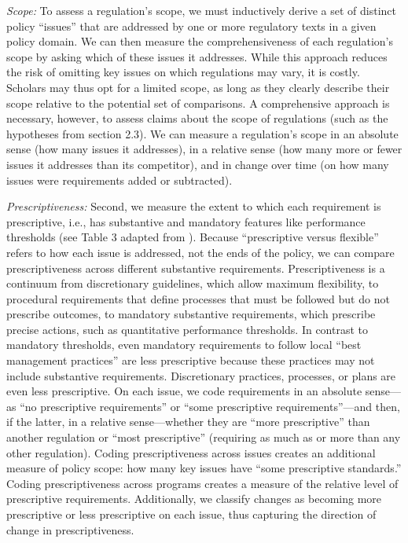 \documentclass[
      12pt,
            Review ]{article}
\begin{document}


\emph{Scope:} To assess a regulation's scope, we must inductively derive
a set of distinct policy ``issues'' that are addressed by one or more
regulatory texts in a given policy domain. We can then measure the
comprehensiveness of each regulation's scope by asking which of these
issues it addresses. While this approach reduces the risk of omitting
key issues on which regulations may vary, it is costly. Scholars may
thus opt for a limited scope, as long as they clearly describe their
scope relative to the potential set of comparisons. A comprehensive
approach is necessary, however, to assess claims about the scope of
regulations (such as the hypotheses from section 2.3). We can measure a
regulation's scope in an absolute sense (how many issues it addresses),
in a relative sense (how many more or fewer issues it addresses than its
competitor), and in change over time (on how many issues were
requirements added or subtracted).

\emph{Prescriptiveness:} Second, we measure the extent to which each
requirement is prescriptive, i.e., has substantive and mandatory
features like performance thresholds (see Table 3 adapted from
\citet{Cashore2007}). Because ``prescriptive versus flexible'' refers to
how each issue is addressed, not the ends of the policy, we can compare
prescriptiveness across different substantive requirements.
Prescriptiveness is a continuum from discretionary guidelines, which
allow maximum flexibility, to procedural requirements that define
processes that must be followed but do not prescribe outcomes, to
mandatory substantive requirements, which prescribe precise actions,
such as quantitative performance thresholds. In contrast to mandatory
thresholds, even mandatory requirements to follow local ``best
management practices'' are less prescriptive because these practices may
not include substantive requirements. Discretionary practices,
processes, or plans are even less prescriptive. On each issue, we code
requirements in an absolute sense---as ``no prescriptive requirements''
or ``some prescriptive requirements''---and then, if the latter, in a
relative sense---whether they are ``more prescriptive'' than another
regulation or ``most prescriptive'' (requiring as much as or more than
any other regulation). Coding prescriptiveness across issues creates an
additional measure of policy scope: how many key issues have ``some
prescriptive standards.'' Coding prescriptiveness across programs
creates a measure of the relative level of prescriptive requirements.
Additionally, we classify changes as becoming more prescriptive or less
prescriptive on each issue, thus capturing the direction of change in
prescriptiveness.
\end{document}
